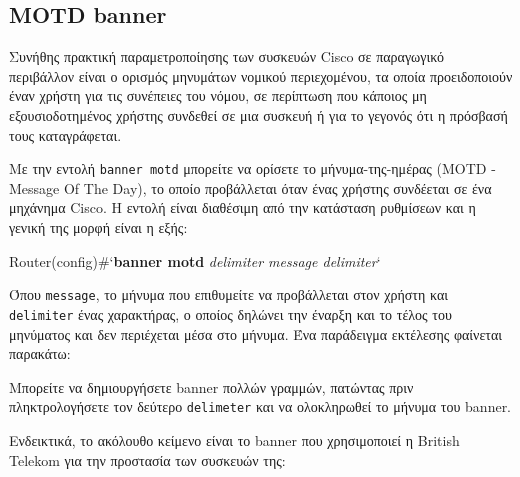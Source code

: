 \documentclass{EdipyLabs} %
\begin{document}
\subsection{MOTD banner}

Συνήθης πρακτική παραμετροποίησης των συσκευών Cisco σε παραγωγικό περιβάλλον είναι ο ορισμός μηνυμάτων νομικού περιεχομένου, τα οποία προειδοποιούν έναν χρήστη για τις συνέπειες του νόμου, σε περίπτωση που κάποιος μη εξουσιοδοτημένος χρήστης συνδεθεί σε μια συσκευή ή για το γεγονός ότι η πρόσβασή τους καταγράφεται.

Με την εντολή \texttt{banner motd} μπορείτε να ορίσετε το μήνυμα-της-ημέρας (MOTD - Message Of The Day), το οποίο προβάλλεται όταν ένας χρήστης συνδέεται σε ένα μηχάνημα Cisco. Η εντολή είναι διαθέσιμη από την κατάσταση ρυθμίσεων και η γενική της μορφή είναι η εξής:

\begin{CommandBox}
Router(config)#`\textbf{banner motd} \textit{delimiter message delimiter}`
\end{CommandBox}

Όπου \texttt{message}, το μήνυμα που επιθυμείτε να προβάλλεται στον χρήστη και \texttt{delimiter} ένας χαρακτήρας, ο οποίος δηλώνει την έναρξη και το τέλος του μηνύματος και δεν περιέχεται μέσα στο μήνυμα. Ένα παράδειγμα εκτέλεσης φαίνεται παρακάτω:


Μπορείτε να δημιουργήσετε banner πολλών γραμμών, πατώντας  πριν πληκτρολογήσετε τον δεύτερο \texttt{delimeter} και να ολοκληρωθεί το μήνυμα του banner.

Ενδεικτικά, το ακόλουθο κείμενο είναι το banner που χρησιμοποιεί η British Telekom για την προστασία των συσκευών της:
\end{document}
